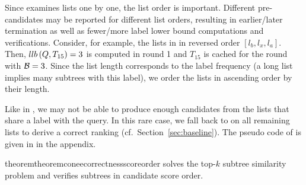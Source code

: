 Since \cone{} examines lists one by one, the list order is important. Different pre-candidates may be reported for different list orders, resulting in earlier/later termination as well as fewer/more label lower bound computations and verifications. Consider, for example, the lists in  in reversed order $\left[l_b, l_x, l_a\right]$. Then, $llb \left( Q, T_{15} \right) = 3$ is computed in round 1 and $T_{15}$ is cached for the round with $\mathcal{B} = 3$. Since the list length corresponds to the label frequency (a long list implies many subtrees with this label), we order the lists in ascending order by their length.

\medskip

Like in \lowerboundmerge{}, we may not be able to produce enough candidates from the lists that share a label with the query. In this rare case, we fall back to \lowerboundmerge{} on all remaining lists to derive a correct ranking (cf.\ Section~\ref{sec:baseline}). The pseudo code of \cone{} is given in  in the appendix.

\begin{restatable}{theorem}{theoremconeecorrectnessscoreorder}
\label{th:cone-correctness-score-order}
\cone{} solves the top-$k$ subtree similarity problem and verifies subtrees in candidate score order.
\end{restatable}

